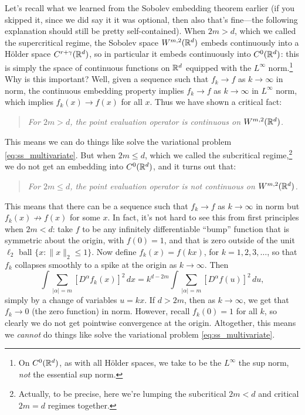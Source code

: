 \documentclass{article}
\begin{document}
Let's recall what we learned from the Sobolev embedding theorem earlier (if you
skipped it, since we did say it it was optional, then also that's fine---the 
following explanation should still be pretty self-contained). When $2m > d$,
which we called the supercritical regime, the Sobolev space $W^{m,2}(\mathbb{R}^d)$
embeds continuously into a H{\"o}lder space $C^{r+\gamma}(\mathbb{R}^d)$, so in
particular it embeds continuously into $C^0(\mathbb{R}^d)$: this is simply the space of
continuous functions on $\mathbb{R}^d$ equipped with the $L^\infty$ norm.\footnote{On 
  $C^0(\mathbb{R}^d)$, as with all H{\"o}lder spaces, we take to be the $L^\infty$ the
  sup norm, \emph{not} the essential sup norm.}   
Why is this important? Well, given a sequence such that $f_k \to f$ as $k \to
\infty$ in  norm, the continuous embedding
property implies $f_k \to f$ as $k \to \infty$ in $L^\infty$ norm, which implies
$f_k(x) \to f(x)$ for all $x$. Thus we have shown a critical fact: 
\begin{quote}
\centering\it
For $2m > d$, the point evaluation operator is continuous on $W^{m,2}(\mathbb{R}^d)$. 
\end{quote}
This means we can do things like solve the variational problem
\eqref{eq:ss_multivariate}. But when $2m \leq d$, which we called the
subcritical regime,\footnote{Actually, to be precise, here we're lumping the
  subcritical $2m < d$ and critical $2m=d$ regimes together.}
we do not get an embedding into $C^0(\mathbb{R}^d)$, and it turns out that:
\begin{quote}
\centering\it
For $2m \leq d$, the point evaluation operator is not continuous on
$W^{m,2}(\mathbb{R}^d)$. 
\end{quote}
This means that there can be a sequence such that $f_k \to f$ as $k \to \infty$ 
in  norm but $f_k(x) \not\to f(x)$ for some
$x$. In fact, it's not hard to see this from first principles when $2m < d$:
take $f$ to be any infinitely differentiable ``bump'' function that is symmetric
about the origin, with $f(0) = 1$, and that is zero outside of the unit $\ell_2$ 
ball $\{x : \|x\|_2 \leq 1\}$. Now define $f_k(x) = f(k x)$, for
$k=1,2,3,\dots$, so that $f_k$ collapses smoothly to a spike at the origin as $k  
\to \infty$. Then 
\[
\int \sum_{|\alpha| = m} [D^\alpha f_k(x)]^2 \, dx = 
k^{d-2m} \int \sum_{|\alpha| = m} [D^\alpha f(u)]^2 \, du, 
\]
simply by a change of variables $u = k x$. If $d > 2m$, then as $k \to \infty$,
we get that $f_k \to 0$ (the zero function) in
 norm. However, recall $f_k(0) = 1$ for all
$k$, so clearly we do not get pointwise convergence at the origin. Altogether,
this means we \emph{cannot} do things like solve the variational problem
\eqref{eq:ss_multivariate}. 
\end{document}
